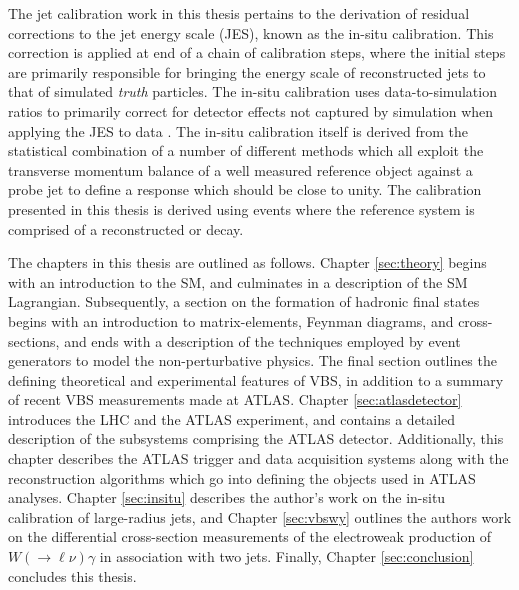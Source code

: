The jet calibration work in this thesis pertains to the derivation of residual corrections to the jet energy scale (JES), known as the in-situ calibration. This correction is applied at end of a chain of calibration steps, where the initial steps are primarily responsible for bringing the energy scale of reconstructed jets to that of simulated \textit{truth} particles. The in-situ calibration uses data-to-simulation ratios to primarily correct for detector effects not captured by simulation when applying the JES to data \cite{Atlas:largercali}. The in-situ calibration itself is derived from the statistical combination of a number of different methods which all exploit the transverse momentum balance of a well measured reference object against a probe jet to define a response which should be close to unity. The calibration presented in this thesis is derived using events where the reference system is comprised of a reconstructed \zee or \zmm decay.

The chapters in this thesis are outlined as follows. Chapter \ref{sec:theory} begins with an introduction to the SM, and culminates in a description of the SM Lagrangian. Subsequently, a section on the formation of hadronic final states begins with an introduction to matrix-elements, Feynman diagrams, and cross-sections, and ends with a description of the techniques employed by event generators to model the non-perturbative physics. The final section outlines the defining theoretical and experimental features of VBS, in addition to a summary of recent VBS measurements made at ATLAS. Chapter \ref{sec:atlasdetector} introduces the LHC and the ATLAS experiment, and contains a detailed description of the subsystems comprising the ATLAS detector. Additionally, this chapter describes the ATLAS trigger and data acquisition systems along with the reconstruction algorithms which go into defining the objects used in ATLAS analyses. Chapter \ref{sec:insitu} describes the author's work on the in-situ calibration of large-radius jets, and Chapter \ref{sec:vbswy} outlines the authors work on the differential cross-section measurements of the electroweak production of $W(\rightarrow\ell\nu)\gamma$ in association with two jets. Finally, Chapter \ref{sec:conclusion} concludes this thesis.

